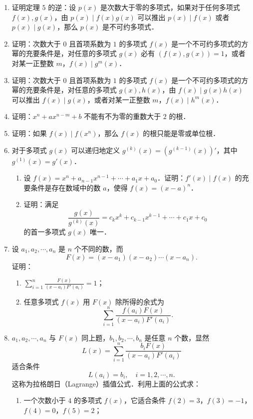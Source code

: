 \begin{enumerate}
  \item 证明定理 $5$ 的逆：设 $p(x)$ 是次数大于零的多项式，如果对于任何多项式 $f(x),g(x)$，由 $p(x)\mid f(x)g(x)$ 可以推出 $p(x)\mid f(x)$ 或者 $p(x)\mid g(x)$，那么 $p(x)$ 是不可约多项式．
  \ansproof
  \item 证明：次数大于 $0$ 且首项系数为 $1$ 的多项式 $f(x)$ 是一个不可约多项式的方幂的充要条件是，对任意的多项式 $g(x)$ 必有 $(f(x),g(x))=1$，或者对某一正整数 $m$，$f(x)\mid g^m(x)$．
  \ansproof
  \item 证明：次数大于 $0$ 且首项系数为 $1$ 的多项式 $f(x)$ 是一个不可约多项式的方幂的充要条件是，对任意的多项式 $g(x),h(x)$，由 $f(x)\mid g(x)h(x)$ 可以推出 $f(x)\mid g(x)$，或者对某一正整数 $m$，$f(x)\mid h^m(x)$．
  \ansproof
  \item 证明：$x^n+ax^{n-m}+b$ 不能有不为零的重数大于 $2$ 的根．
  \ansproof
  \item 证明：如果 $f(x)\mid f(x^n)$，那么 $f(x)$ 的根只能是零或单位根．
  \ansproof
  \item 对于多项式 $g(x)$ 可以递归地定义 $g^{(k)}(x)=(g^{(k-1)}(x))'$，其中 $g^{(1)}(x)=g'(x)$．
  \begin{enumerate}
    \item 设 $f(x)=x^n+a_{n-1}x^{n-1}+\cdots+a_1x+a_0$．证明：$f'(x)\mid f(x)$ 的充要条件是存在数域中的数 $a$，使得 $f(x)=(x-a)^n$．
  \anssub
    \item 证明：满足
    \[
      \frac{g(x)}{g^{(k)}(x)}=c_kx^k+c_{k-1}x^{k-1}+\cdots+c_1x+c_0
    \]
    的首一多项式 $g(x)$ 唯一．
  \anssub
  \end{enumerate}
  \item 设 $a_1,a_2,\cdots,a_n$ 是 $n$ 个不同的数，而
  \[
    F(x)=(x-a_1)(x-a_2)\cdots(x-a_n).
  \]
  证明：
  \begin{enumerate}
    \item $\displaystyle\sum_{i=1}^n\frac{F(x)}{(x-a_i)F'(a_i)}=1$；
  \anssub
    \item 任意多项式 $f(x)$ 用 $F(x)$ 除所得的余式为
    \[
      \sum_{i=1}^n\frac{f(a_i)F(x)}{(x-a_i)F'(a_i)}.
    \]
  \anssub
  \end{enumerate}
  \item $a_1,a_2,\cdots,a_n$ 与 $F(x)$ 同上题，$b_1,b_2,\cdots,b_n$ 是任意 $n$ 个数，显然
  \[
    L(x)=\sum_{i=1}^n\frac{b_iF(x)}{(x-a_i)F'(a_i)}
  \]
  适合条件
  \[
    L(a_i)=b_i,\quad i=1,2,\cdots,n.
  \]
  这称为拉格朗日（Lagrange）插值公式．利用上面的公式求：
  \begin{enumerate}
    \item 一个次数小于 $4$ 的多项式 $f(x)$，它适合条件 $f(2)=3$，$f(3)=-1$，$f(4)=0$，$f(5)=2$；

\end{enumerate}
\end{enumerate}
